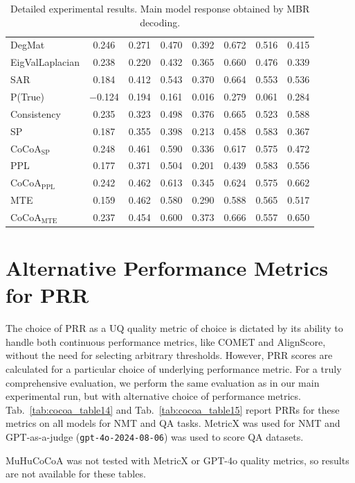 \documentclass[11pt]{article}
\newcommand{\method}{MuHuCoCoA}
\newcommand{\tabref}[1]{Tab.~\ref{#1}}
\begin{document}
\begin{table}[htbp]
{\begin{tabular}{l ccccccc}
DegMat & 0.246 & 0.271 & 0.470 & 0.392 & 0.672 & 0.516 & 0.415 \\
EigValLaplacian & 0.238 & 0.220 & 0.432 & 0.365 & 0.660 & 0.476 & 0.339 \\
SAR & 0.184 & 0.412 & 0.543 & 0.370 & 0.664 & 0.553 & 0.536 \\
P(True) & $-$0.124 & 0.194 & 0.161 & 0.016 & 0.279 & 0.061 & 0.284 \\
Consistency & 0.235 & 0.323 & 0.498 & 0.376 & 0.665 & 0.523 & 0.588 \\
SP & 0.187 & 0.355 & 0.398 & 0.213 & 0.458 & 0.583 & 0.367 \\
CoCoA$_{\mathrm{SP}}$ & 0.248 & 0.461 & 0.590 & 0.336 & 0.617 & 0.575 & 0.472 \\
PPL & 0.177 & 0.371 & 0.504 & 0.201 & 0.439 & 0.583 & 0.556 \\
CoCoA$_{\mathrm{PPL}}$ & 0.242 & 0.462 & 0.613 & 0.345 & 0.624 & 0.575 & 0.662 \\
MTE & 0.159 & 0.462 & 0.580 & 0.290 & 0.588 & 0.565 & 0.517 \\
CoCoA$_{\mathrm{MTE}}$ & 0.237 & 0.454 & 0.600 & 0.373 & 0.666 & 0.557 & 0.650 \\
\bottomrule
\end{tabular}%
}
\caption{Detailed experimental results. Main model response obtained by MBR decoding.}
\label{tab:cocoa_table13}
\end{table}
\section{Alternative Performance Metrics for PRR}
\label{app:alt_metrics}

The choice of PRR as a UQ quality metric of choice is dictated by its ability to handle both continuous performance metrics, like COMET and AlignScore, without the need for selecting arbitrary thresholds. However, PRR scores are calculated for a particular choice of underlying performance metric. For a truly comprehensive evaluation, we perform the same evaluation as in our main experimental run, but with alternative choice of performance metrics. \tabref{tab:cocoa_table14} and \tabref{tab:cocoa_table15} report PRRs for these metrics on all models for NMT and QA tasks. MetricX was used for NMT and GPT-as-a-judge (\texttt{gpt-4o-2024-08-06}) was used to score QA datasets.

\method{} was not tested with MetricX or GPT-4o quality metrics, so results are not available for these tables.
\end{document}
